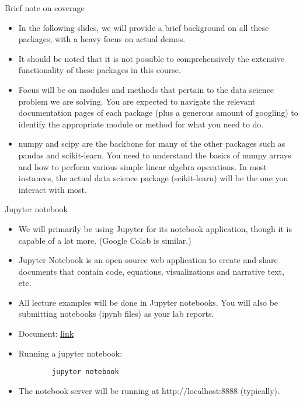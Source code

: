 \documentclass[aspectratio=169]{beamer}
\begin{document}
    \begin{frame}{Brief note on coverage}
        \begin{itemize}
            \item In the following slides, we will provide a brief background on all these packages, with a heavy focus on actual demos.
            \item It should be noted that it is not possible to comprehensively the extensive functionality of these packages in this course.
            \item Focus will be on modules and methods that pertain to the data science problem we are solving. You are expected to navigate the relevant documentation pages of each package (plus a generous amount of googling) to identify the appropriate module or method for what you need to do.
            \item numpy and scipy are the backbone for many of the other packages such as pandas and scikit-learn. You need to understand the basics of numpy arrays and how to perform various simple linear algebra operations. In most instances, the actual data science package (scikit-learn) will be the one you interact with most.
        \end{itemize}
    \end{frame}


    \begin{frame}[fragile]{Jupyter notebook}
        \begin{itemize}
            \item We will primarily be using Jupyter for its notebook application, though it is capable of a lot more. (Google Colab is similar.)
            \item Jupyter Notebook is an open-source web application to create and share documents that contain code, equations, visualizations and narrative text, etc.
            \item All lecture examples will be done in Jupyter notebooks. You will also be submitting notebooks (ipynb files) as your lab reports.
            \item Document: \href{http://jupyter-notebook.readthedocs.io/en/stable/}{link}
            \item Running a jupyter notebook:
            \begin{verbatim}
        jupyter notebook
            \end{verbatim}
            \item The notebook server will be running at http://localhost:8888 (typically).
        \end{itemize}
    \end{frame}
\end{document}
